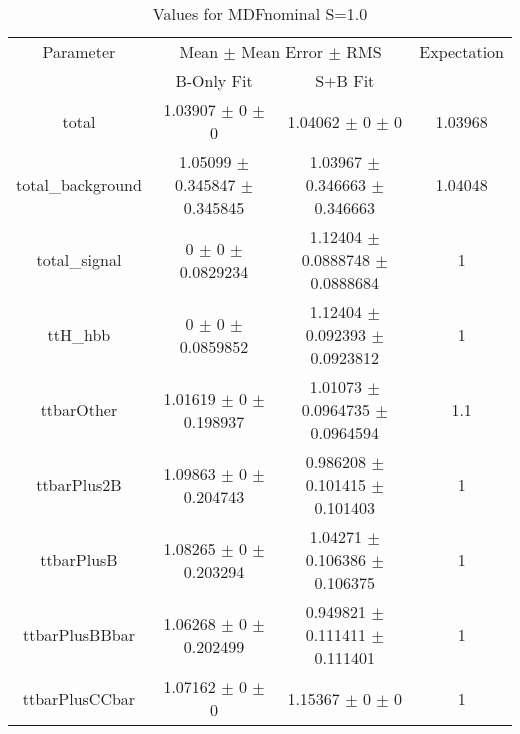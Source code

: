 \begin{table}
\centering
\caption{Values for MDFnominal S=1.0}
\begin{tabular}{cccc}
\toprule
Parameter & \multicolumn{2}{c}{Mean $\pm$ Mean Error $\pm$ RMS} & Expectation\\
 & B-Only Fit & S+B Fit & \\
\midrule
total & \num{1.03907} $\pm$ \num{0} $\pm$ \num{0} & \num{1.04062} $\pm$ \num{0} $\pm$ \num{0} & \num{1.03968}\\
total\_background & \num{1.05099} $\pm$ \num{0.345847} $\pm$ \num{0.345845} & \num{1.03967} $\pm$ \num{0.346663} $\pm$ \num{0.346663} & \num{1.04048}\\
total\_signal & \num{0} $\pm$ \num{0} $\pm$ \num{0.0829234} & \num{1.12404} $\pm$ \num{0.0888748} $\pm$ \num{0.0888684} & \num{1}\\
ttH\_hbb & \num{0} $\pm$ \num{0} $\pm$ \num{0.0859852} & \num{1.12404} $\pm$ \num{0.092393} $\pm$ \num{0.0923812} & \num{1}\\
ttbarOther & \num{1.01619} $\pm$ \num{0} $\pm$ \num{0.198937} & \num{1.01073} $\pm$ \num{0.0964735} $\pm$ \num{0.0964594} & \num{1.1}\\
ttbarPlus2B & \num{1.09863} $\pm$ \num{0} $\pm$ \num{0.204743} & \num{0.986208} $\pm$ \num{0.101415} $\pm$ \num{0.101403} & \num{1}\\
ttbarPlusB & \num{1.08265} $\pm$ \num{0} $\pm$ \num{0.203294} & \num{1.04271} $\pm$ \num{0.106386} $\pm$ \num{0.106375} & \num{1}\\
ttbarPlusBBbar & \num{1.06268} $\pm$ \num{0} $\pm$ \num{0.202499} & \num{0.949821} $\pm$ \num{0.111411} $\pm$ \num{0.111401} & \num{1}\\
ttbarPlusCCbar & \num{1.07162} $\pm$ \num{0} $\pm$ \num{0} & \num{1.15367} $\pm$ \num{0} $\pm$ \num{0} & \num{1}\\
\bottomrule
\end{tabular}
\end{table}